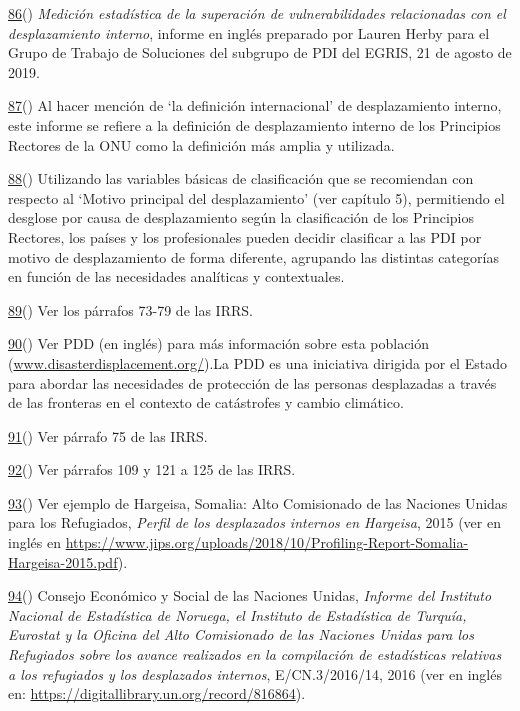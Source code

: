 \documentclass[
]{book}
\begin{document}
\protect\hyperlink{sdfootnote86anc}{86}() \emph{Medición estadística de la superación de vulnerabilidades relacionadas con el desplazamiento interno}, informe en inglés preparado por Lauren Herby para el Grupo de Trabajo de Soluciones del subgrupo de PDI del EGRIS, 21 de agosto de 2019.

\protect\hyperlink{sdfootnote87anc}{87}() Al hacer mención de `la definición internacional' de desplazamiento interno, este informe se refiere a la definición de desplazamiento interno de los Principios Rectores de la ONU como la definición más amplia y utilizada.

\protect\hyperlink{sdfootnote88anc}{88}() Utilizando las variables básicas de clasificación que se recomiendan con respecto al `Motivo principal del desplazamiento' (ver capítulo 5), permitiendo el desglose por causa de desplazamiento según la clasificación de los Principios Rectores, los países y los profesionales pueden decidir clasificar a las PDI por motivo de desplazamiento de forma diferente, agrupando las distintas categorías en función de las necesidades analíticas y contextuales.

\protect\hyperlink{sdfootnote89anc}{89}() Ver los párrafos 73-79 de las IRRS.

\protect\hyperlink{sdfootnote90anc}{90}() Ver PDD (en inglés) para más información sobre esta población (\href{http://www.disasterdisplacement.org/}{www.disasterdisplacement.org/}).La PDD es una iniciativa dirigida por el Estado para abordar las necesidades de protección de las personas desplazadas a través de las fronteras en el contexto de catástrofes y cambio climático.

\protect\hyperlink{sdfootnote91anc}{91}() Ver párrafo 75 de las IRRS.

\protect\hyperlink{sdfootnote92anc}{92}() Ver párrafos 109 y 121 a 125 de las IRRS.

\protect\hyperlink{sdfootnote93anc}{93}() Ver ejemplo de Hargeisa, Somalia: Alto Comisionado de las Naciones Unidas para los Refugiados, \emph{Perfil de los desplazados internos en Hargeisa}, 2015 (ver en inglés en \url{https://www.jips.org/uploads/2018/10/Profiling-Report-Somalia-Hargeisa-2015.pdf}).

\protect\hyperlink{sdfootnote94anc}{94}() Consejo Económico y Social de las Naciones Unidas, \emph{Informe del Instituto Nacional de Estadística de Noruega, el Instituto de Estadística de Turquía, Eurostat y la Oficina del Alto Comisionado de las Naciones Unidas para los Refugiados sobre los avance realizados en la compilación de estadísticas relativas a los refugiados y los desplazados internos}, E/CN.3/2016/14, 2016 (ver en inglés en: \url{https://digitallibrary.un.org/record/816864}).
\end{document}
